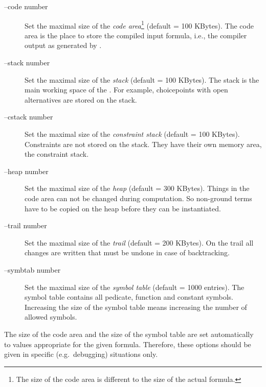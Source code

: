 \begin{description}
      \item[--code number] 
           {Set the maximal size of the {\it code area\/}\footnote{The
            size of the code area is different to the size of the
            actual formula.} (default = 100 KBytes). The code area is
            the place to store the compiled 
            input formula, i.e., the compiler output as generated by
            \wasm.}
      \item[--stack number] 
           {Set the maximal  size  of  the  {\it stack\/}  (default = 100
            KBytes). The stack is the main working space of the
            \SAM. For example, choicepoints with open
            alternatives are stored on the stack.}
      \item[--cstack number] 
           {Set the maximal size of the {\it constraint stack\/} 
            (default = 100 KBytes). Constraints are not stored on the
            stack. They have their own memory area, the constraint
            stack.} 
      \item[--heap number] 
           {Set the maximal size of the {\it heap\/} (default = 300
            KBytes). Things in the code area can not be changed during
            computation. So non-ground terms have to be copied on the
            heap before they can be instantiated.}
      \item[--trail number] 
           {Set the maximal size of the {\it trail\/} (default = 200
            KBytes). On the trail all changes are written that must be
            undone in case of backtracking.} 
      \item[--symbtab number] 
           {Set the maximal size of the {\it symbol table\/} (default = 1000
            entries). The symbol table contains all pedicate, function
            and constant symbols. Increasing the size of the
            symbol table means increasing the number of allowed
            symbols.} 
\end{description}

\begin{remark}
The size of the code area and the size of the symbol table are set
automatically to values appropriate for the given formula. Therefore,
these options should be given in specific (e.g.\ debugging) situations
only. 
\end{remark}

